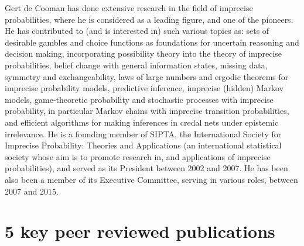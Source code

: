\documentclass[10pt,a4paper,sans]{moderncv}
\begin{document}
\hspace{10pt}Gert de Cooman has done extensive research in the field of imprecise probabilities, where he is considered as a leading figure, and one of the pioneers.
He has contributed to (and is interested in) such various topics as: sets of desirable gambles and choice functions as foundations for uncertain reasoning and decision making, incorporating possibility theory into the theory of imprecise probabilities, belief change with general information states, missing data, symmetry and exchangeability, laws of large numbers and ergodic theorems for imprecise probability models, predictive inference, imprecise (hidden) Markov models, game-theoretic probability and stochastic processes with imprecise probability, in particular Markov chains with imprecise transition probabilities, and efficient algorithms for making inferences in credal nets under epistemic irrelevance.
He is a founding member of SIPTA, the International Society for Imprecise Probability:
Theories and Applications (an international statistical society whose aim is to promote research in, and applications of imprecise probabilities), and served as its President between 2002 and 2007. He has been also been a member of its Executive Committee, serving in various roles, between 2007 and 2015.

\vspace{2pt}
\section{5 key peer reviewed publications}
\vspace{5pt}
\small
{}
\end{document}
